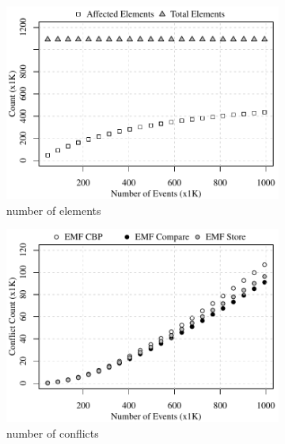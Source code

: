 \begin{figure}[ht]
\centering
\begin{subfigure}[t]{0.490\linewidth}
	\includegraphics[width=\linewidth]{conflict-size-events}
	\caption{number of elements}
	\label{fig:conflict-size-events}
\end{subfigure}
\hfill
\begin{subfigure}[t]{0.490\linewidth}
	\includegraphics[width=\linewidth]{conflict-count-events}
	\caption{number of conflicts}
	\label{fig:conflict-count-events}
\end{subfigure}
\\
\begin{subfigure}[t]{0.490\linewidth}

\end{subfigure}
\end{figure}
